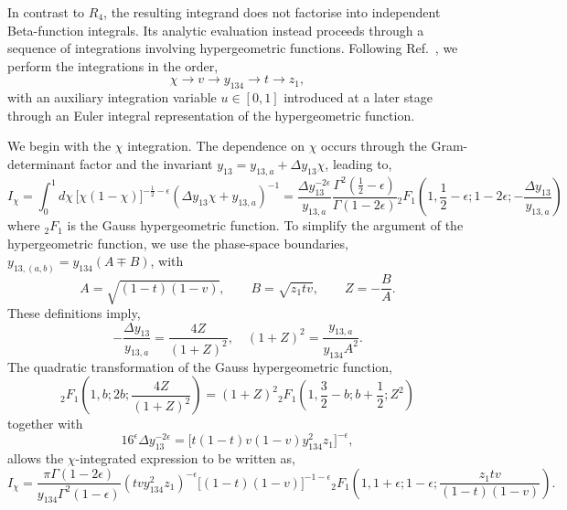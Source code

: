 In contrast to $R_4$, the resulting integrand does not factorise into independent Beta-function
integrals. Its analytic evaluation instead proceeds through a sequence of integrations involving
hypergeometric functions. Following Ref.~\cite{GehrmannDeRidder0311276}, we perform the
integrations in the order,
\begin{equation*}
    \chi\to v\to y_{134}\to t\to z_1,
\end{equation*}
with an auxiliary integration variable $u\in[0,1]$ introduced at a later stage through an Euler
integral representation of the hypergeometric function.

We begin with the $\chi$ integration. The dependence on $\chi$ occurs through the
Gram-determinant factor and the invariant $y_{13}=y_{13,a}+\Delta y_{13}\chi$, leading to,
\begin{equation}
    I_\chi=\int_0^1 d\chi\,\Big[\chi(1-\chi)\Big]^{-\frac12-\epsilon}(\Delta y_{13}\chi+y_{13,a})^{-1}=\frac{\Delta y_{13}^{-2\epsilon}}{y_{13,a}}\frac{\Gamma^2\!\left(\frac12-\epsilon\right)}{\Gamma(1-2\epsilon)}{}_2F_1\!\left(1, \frac12-\epsilon; 1-2\epsilon; -\frac{\Delta y_{13}}{y_{13,a}}\right)
\end{equation}
where ${}_2F_1$ is the Gauss hypergeometric function. To simplify the argument of the
hypergeometric function, we use the phase-space boundaries,
$y_{13,(a,b)}=y_{134}(A\mp B)$, with
\begin{equation*}
    A=\sqrt{(1-t)(1-v)},\qquad B=\sqrt{z_1tv},\qquad Z=-\frac BA.
\end{equation*}
These definitions imply,
\begin{equation}
    -\frac{\Delta y_{13}}{y_{13,a}} = \frac{4Z}{(1+Z)^2},\quad (1+Z)^2 = \frac{y_{13,a}}{y_{134}A^2}.
\end{equation}
The quadratic transformation of the Gauss hypergeometric function,
\begin{equation}
    {}_2F_1\!\left(1,b;2b;\frac{4Z}{(1+Z)^2}\right) = (1+Z)^2{}_2F_1\!\left(1,\frac32-b;b+\frac12;Z^2\right)
\end{equation}
together with
\begin{equation}
    16^\epsilon\Delta y_{13}^{-2\epsilon}=\Big[t(1-t)v(1-v)y_{134}^2z_1\Big]^{-\epsilon},
\end{equation}
allows the $\chi$-integrated expression to be written as,
\begin{equation}
    I_\chi = \frac{\pi\Gamma(1-2\epsilon)}{y_{134}\Gamma^2(1-\epsilon)}\!\left(tvy_{134}^2z_1\right)^{-\epsilon}\Big[(1-t)(1-v)\Big]^{-1-\epsilon}{}_2F_1\!\left(1,1+\epsilon;1-\epsilon;\frac{z_1tv}{(1-t)(1-v)}\right).
\end{equation}

